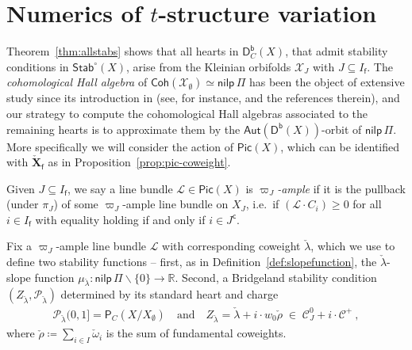 \documentclass[reqno,a4paper]{amsart}
\newcommand{\calC}{\mathcal{C}}
\newcommand{\calL}{\mathcal{L}}
\newcommand{\calP}{\mathcal{P}}
\newcommand{\calX}{\mathcal{X}}
\newcommand{\R}{\mathbb{R}}
\newcommand{\sff}{\mathsf{f}}
\newcommand{\bfX}{\mathbf{X}}
\newcommand{\catPC}{\mathsf{P}_{C}}
\newcommand{\Stab}{\mathsf{Stab}}
\newcommand{\nilpPi}{\mathsf{nilp}\, \Pi}
\newcommand{\catCoh}{\mathsf{Coh}}
\newcommand{\catDb}{\mathsf{D}^\mathsf{b}}
\newcommand{\catDbC}{\mathsf{D}^\mathsf{b}_C}
\newcommand{\Lomega}{\check{\omega}}
\newcommand{\Llambda}{{\check{\lambda}}}
\newcommand{\Lrho}{\check{\rho}}
\newcommand{\weightlattice}{\bfX}
\newcommand{\coweightlattice}{\check{\weightlattice}}
\newcommand{\coweightlatticefin}{\coweightlattice_\sff}
\newcommand{\rsv}{X}
\newcommand{\ssv}{X_\emptyset}
\newcommand{\psv}{X_J}
\newcommand{\Jcomp}{{J^\mathsf{c}}}
\newcommand{\Aut}{\mathsf{Aut}}
\newcommand{\Pic}{\mathsf{Pic}}
\theoremstyle{basic-theorem}
\numberwithin{equation}{section}
\begin{document}
\section{Numerics of $t$-structure variation}\label{sec:numerical-tilts}

Theorem~\ref{thm:allstabs} shows that all hearts in $\catDbC(\rsv)$, that admit stability conditions in $\Stab^\circ(\rsv)$, arise from the Kleinian orbifolds $\calX_J$ with $J\subseteq I_\sff$. The \textit{cohomological Hall algebra} of $\catCoh(\calX_\emptyset)\simeq \nilpPi$ has been the object of extensive study since its introduction in \cite{SV_Cherednik} (see, for instance, \cite{SV_Yangians=COHA} and the references therein), and our strategy to compute the cohomological Hall algebras associated to the remaining hearts is to approximate them by the $\Aut(\catDb(\rsv))$-orbit of $\nilpPi$. More specifically we will consider the action of $\Pic(\rsv)$, which can be identified with $\coweightlatticefin$ as in Proposition~\ref{prop:pic-coweight}.

\begin{definition}
    Given $J\subseteq I_\sff$, we say a line bundle $\calL\in \Pic(\rsv)$ is \textit{$\varpi_J$-ample} if it is the pullback (under $\pi_J$) of some $\varpi_J$-ample line bundle on $\psv$, i.e.\ if $(\calL\cdot C_i)\geq 0$ for all $i\in I_\sff$ with equality holding if and only if $i\in \Jcomp$.
\end{definition}


Fix a $\varpi_J$-ample line bundle $\calL$ with corresponding coweight $\Llambda$, which we use to define two stability functions -- first, as in Definition~\ref{def:slopefunction}, the $\Llambda$-slope function
$\mu_\Llambda\colon \nilpPi\smallsetminus \{0\} \to \R$. Second, a Bridgeland stability condition $(Z_\Llambda,\calP_\Llambda)$ determined by its standard heart and charge
\begin{align}
	\calP_\Llambda(0,1]=\catPC(\rsv/\ssv)\quad\text{and}\quad Z_\Llambda = \Llambda + i\cdot w_0\Lrho \; \in\; \calC_J^0+i\cdot \calC^+\ ,
\end{align}
where $\Lrho\coloneqq\sum_{i\in I} \Lomega_i$ is the sum of fundamental coweights.
\end{document}
